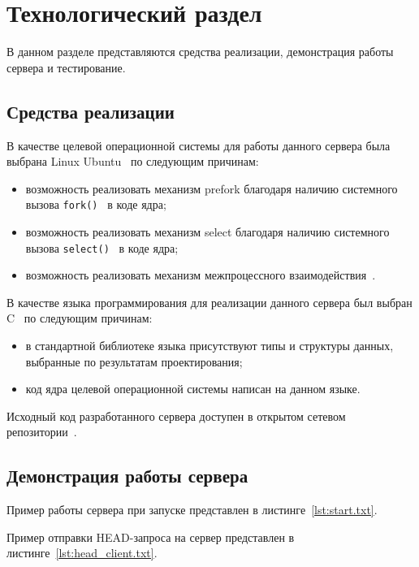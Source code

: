 \chapter{Технологический раздел}

В данном разделе представляются средства реализации, демонстрация работы сервера и тестирование.

\section{Средства реализации}

В качестве целевой операционной системы для работы данного сервера была выбрана Linux Ubuntu~\cite{ubuntu} по следующим причинам:
\begin{itemize}
	\item возможность реализовать механизм prefork благодаря наличию системного вызова \texttt{fork()}~\cite{fork} в коде ядра;
	\item возможность реализовать механизм select благодаря наличию системного вызова \texttt{select()}~\cite{select} в коде ядра;
	\item возможность реализовать механизм межпроцессного взаимодействия~\cite{ryzanova}.
\end{itemize} 

В качестве языка программирования для реализации данного сервера был выбран C~\cite{c} по следующим причинам:
\begin{itemize}
	\item в стандартной библиотеке языка присутствуют типы и структуры данных, выбранные по результатам проектирования;
	\item код ядра целевой операционной системы написан на данном языке.
\end{itemize}

Исходный код разработанного сервера доступен в открытом сетевом репозитории~\cite{src}.

\section{Демонстрация работы сервера}

Пример работы сервера при запуске представлен в листинге~\ref{lst:start.txt}.


\newpage

Пример отправки HEAD-запроса на сервер представлен в листинге~\ref{lst:head_client.txt}.

